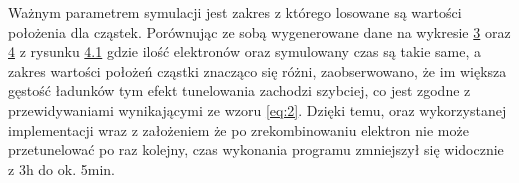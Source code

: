Ważnym parametrem symulacji jest zakres z którego losowane są wartości położenia dla cząstek. Porównując ze sobą wygenerowane dane na wykresie  \hyperref[wykres:1]{3} oraz \hyperref[wykres:2]{4} z rysunku \hyperref[rys:1]{4.1} gdzie ilość elektronów oraz symulowany czas są takie same, a zakres wartości położeń cząstki znacząco się różni, zaobserwowano, że im większa gęstość ładunków tym efekt tunelowania zachodzi szybciej, co jest zgodne z przewidywaniami wynikającymi ze wzoru \ref{eq:2}. Dzięki temu, oraz wykorzystanej implementacji wraz z założeniem że po zrekombinowaniu elektron nie może przetunelować po raz kolejny, czas wykonania programu zmniejszył się widocznie z 3h do ok. 5min. 
